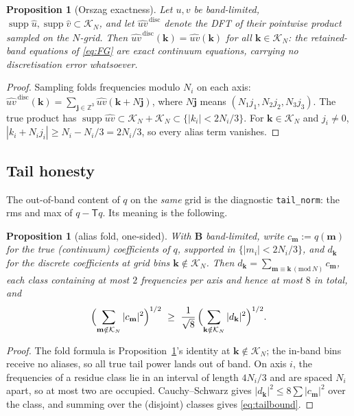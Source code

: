 \documentclass[11pt]{article}
\newtheorem{proposition}[theorem]{Proposition}
\theoremstyle{definition}
\newcommand{\B}{\mathbf{B}}
\newcommand{\kk}{\mathbf{k}}
\newcommand{\Z}{\mathbb{Z}}
\newcommand{\Tr}{\mathsf{T}}
\newcommand{\supp}{\operatorname{supp}}
\begin{document}
\begin{proposition}[Orszag exactness]\label{prop:orszag}
Let $u,v$ be band-limited, $\supp\hat u,\supp\hat v\subset\mathcal K_N$, and
let $\widehat{uv}^{\,\mathrm{disc}}$ denote the DFT of their pointwise product
sampled on the $N$-grid. Then
$\widehat{uv}^{\,\mathrm{disc}}(\kk)=\widehat{uv}(\kk)$ for all
$\kk\in\mathcal K_N$: the retained-band equations of \eqref{eq:FG} are exact
continuum equations, carrying no discretisation error whatsoever.
\end{proposition}

\begin{proof}
Sampling folds frequencies modulo $N_i$ on each axis:
$\widehat{uv}^{\,\mathrm{disc}}(\kk)=\sum_{\mathbf j\in\Z^3}
\widehat{uv}(\kk+N\mathbf j)$, where $N\mathbf j$ means
$(N_1j_1,N_2j_2,N_3j_3)$. The true product has
$\supp\widehat{uv}\subset\mathcal K_N+\mathcal K_N\subset
\{|k_i|<2N_i/3\}$. For $\kk\in\mathcal K_N$ and $j_i\neq0$,
$|k_i+N_ij_i|\ge N_i-N_i/3=2N_i/3$, so every alias term vanishes.
\end{proof}

\subsection{Tail honesty}

The out-of-band content of $q$ on the \emph{same} grid is the diagnostic
\texttt{tail\_norm}: the rms and max of $q-\Tr q$. Its meaning is the
following.

\begin{proposition}[alias fold, one-sided]\label{prop:tail}
With $\B$ band-limited, write $c_\mathbf m:=\hat q(\mathbf m)$ for the true
(continuum) coefficients of $q$, supported in $\{|m_i|<2N_i/3\}$, and
$d_\kk$ for the discrete coefficients at grid bins $\kk\notin\mathcal K_N$.
Then $d_\kk=\sum_{\mathbf m\equiv\kk\,(\mathrm{mod}\,N)}c_\mathbf m$, each
class containing at most $2$ frequencies per axis and hence at most $8$ in
total, and
\begin{equation}\label{eq:tailbound}
\Bigl(\sum_{\mathbf m\notin\mathcal K_N}|c_\mathbf m|^2\Bigr)^{1/2}
\ \ge\ \frac{1}{\sqrt8}\,
\Bigl(\sum_{\kk\notin\mathcal K_N}|d_\kk|^2\Bigr)^{1/2}.
\end{equation}
\end{proposition}

\begin{proof}
The fold formula is Proposition~\ref{prop:orszag}'s identity at
$\kk\notin\mathcal K_N$; the in-band bins receive no aliases, so all true
tail power lands out of band. On axis $i$, the frequencies of a residue class
lie in an interval of length $4N_i/3$ and are spaced $N_i$ apart, so at most
two are occupied. Cauchy--Schwarz gives $|d_\kk|^2\le8\sum|c_\mathbf m|^2$
over the class, and summing over the (disjoint) classes gives
\eqref{eq:tailbound}.
\end{proof}
\end{document}
